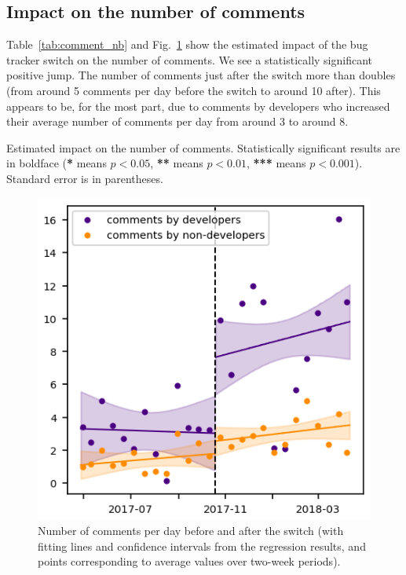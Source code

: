 \documentclass[conference]{IEEEtran}
\begin{document}
\subsection{Impact on the number of comments}

Table~\ref{tab:comment_nb} and Fig.~\ref{comment_nb_rd} show the estimated impact of the bug tracker switch on the number of comments. We see a statistically significant positive jump. The number of comments just after the switch more than doubles (from around 5 comments per day before the switch to around 10 after). This appears to be, for the most part, due to comments by developers who increased their average number of comments per day from around 3 to around 8.

\begin{table}
\centering
\caption{Estimated impact on the number of comments. Statistically significant results are in boldface (\textbf{*} means $p<0.05$, \textbf{**} means $p<0.01$, \textbf{***} means $p<0.001$). Standard error is in parentheses.}
\label{tab:comment_nb}

\end{table}

\begin{figure}
\includegraphics{comment_nb_rd.png}
\caption{Number of comments per day before and after the switch (with fitting lines and confidence intervals from the regression results, and points corresponding to average values over two-week periods).} \label{comment_nb_rd}
\end{figure}
\end{document}
